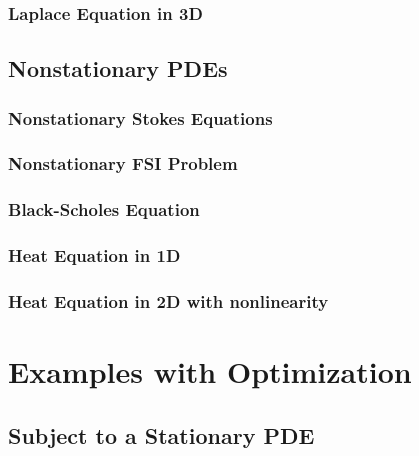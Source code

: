 \documentclass[a4paper,cleardoubleempty]{scrreprt}
\begin{document}
\subsection{Laplace Equation in 3D}
\label{PDE_Stat_Laplace_3D}

\clearpage
\section{Nonstationary PDEs}
\label{PDE_Instat}

\subsection{Nonstationary Stokes Equations}
\label{PDE_Instat_Stokes}

\clearpage
\subsection{Nonstationary FSI Problem}
\label{PDE_Instat_FSI}

\clearpage
\subsection{Black-Scholes Equation}
\label{PDE_Instat_Black_Scholes}

\clearpage
\subsection{Heat Equation in 1D}
\label{PDE_Instat_Heat_1D}

\clearpage
\subsection{Heat Equation in 2D with nonlinearity}
\label{PDE_Instat_Heat_2D}

\cleardoublepage
\chapter{Examples with Optimization}
\label{OPT}
\section{Subject to a Stationary PDE}
\label{OPT_Stat}
\end{document}
